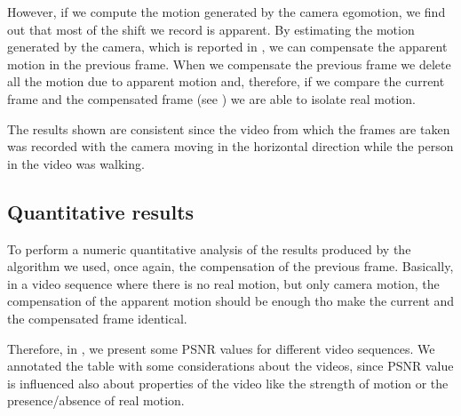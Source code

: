 However, if we compute the motion generated by the camera egomotion, we find out that most of the shift we record is apparent.
By estimating the motion generated by the camera, which is reported in  , we can compensate the apparent motion in the previous frame.
When we compensate the previous frame we delete all the motion due to apparent motion and, therefore, if we compare the current frame and the compensated frame (see ) we are able to isolate real motion.

The results shown are consistent since the video from which the frames are taken was recorded with the camera moving in the horizontal direction while the person in the video was walking.

\subsection{Quantitative results}

To perform a numeric quantitative analysis of the results produced by the algorithm we used, once again, the compensation of the previous frame. Basically, in a video sequence where there is no real motion, but only camera motion, the compensation of the apparent motion should be enough tho make the current and the compensated frame identical.

Therefore, in , we present some PSNR values for different video sequences. We annotated the table with some considerations about the videos, since PSNR value is influenced also about properties of the video like the strength of motion or the presence/absence of real motion.

